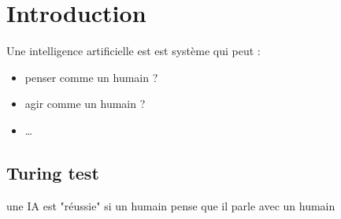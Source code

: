 \section{Introduction}
	
	Une intelligence artificielle est est système qui peut :
	\begin{itemize}
		\item penser comme un humain ?
		\item agir comme un humain ?
		\item \dots 
	\end{itemize}
	\subsection{Turing test}
		une IA est "réussie" si un humain pense que il parle avec un humain